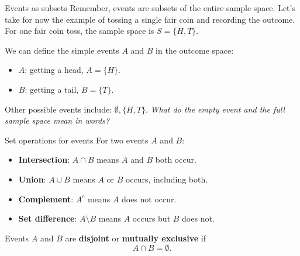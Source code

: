\documentclass[12pt]{beamer}
\newcommand{\vocab}[1]{\textcolor{AggieMaroon}{\textbf{#1}}}
\begin{document}
\begin{frame}{}
\begin{block}{Events as subsets}
Remember, events are subsets of the entire sample space.
Let's take for now the example of tossing a single fair coin and recording the outcome.
For one fair coin toss, the sample space is $S = \{H,T\}$.

\vspace{0.2cm}
We can define the simple events $A$ and $B$ in the outcome space:
\begin{itemize}
  \item $A$: getting a head, $A = \{H\}$.
  \item $B$: getting a tail, $B = \{T\}$.
\end{itemize}

\vspace{0.2cm}
Other possible events include: $\emptyset, \{H,T\}$.
\emph{What do the empty event and the full sample space mean in words?}
\end{block}
\end{frame}

\begin{frame}{}
\begin{block}{Set operations for events}
For two events $A$ and $B$:

\begin{itemize}
  \item \vocab{Intersection}: $A \cap B$ means $A$ and $B$ both occur.
  \item \vocab{Union}: $A \cup B$ means $A$ or $B$ occurs, including both.
  \item \vocab{Complement}: $A^c$ means $A$ does not occur.
  \item \vocab{Set difference}: $A \setminus B$ means $A$ occurs but $B$ does not.
\end{itemize}

\vspace{0.3cm}
Events $A$ and $B$ are \vocab{disjoint} or \vocab{mutually exclusive} if
\[
A \cap B = \emptyset.
\]
\end{block}
\end{frame}

\begin{frame}{}
\centering
{}
\end{frame}
\end{document}
